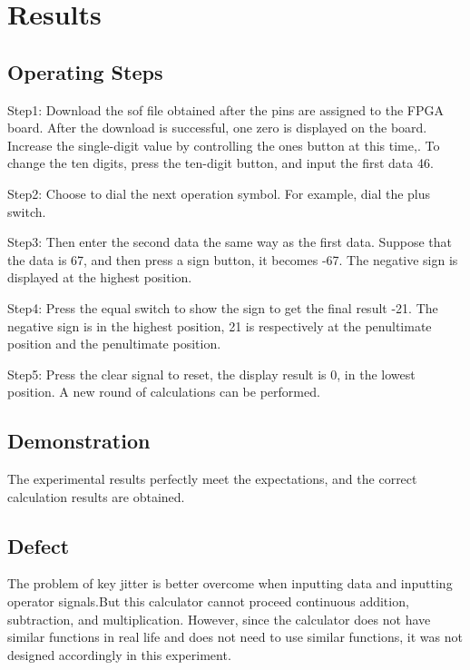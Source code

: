 \documentclass[conference,compsoc]{IEEEtran}
\begin{document}
\section{Results}
\subsection{Operating Steps}
Step1: Download the sof file obtained after the pins are assigned to the FPGA board. After the download is successful, one zero is displayed on the board. Increase the single-digit value by controlling the ones button at this time,. To change the ten digits, press the ten-digit button, and input the first data 46.

Step2: Choose to dial the next operation symbol. For example, dial the plus switch.

Step3: Then enter the second data the same way as the first data. Suppose that the data is 67, and then press a sign button, it becomes -67. The negative sign is displayed at the highest position.

Step4: Press the equal switch to show the sign to get the final result -21. The negative sign is in the highest position, 21 is respectively at the penultimate position and the penultimate position.

Step5: Press the clear signal to reset, the display result is 0, in the lowest position. A new round of calculations can be performed.
\subsection{Demonstration}
The experimental results perfectly meet the expectations, and the correct calculation results are obtained. 
\subsection{Defect}
The problem of key jitter is better overcome when inputting data and inputting operator signals.But this calculator cannot proceed continuous addition, subtraction, and multiplication. However, since the calculator does not have similar functions in real life and does not need to use similar functions, it was not designed accordingly in this experiment.
\end{document}
